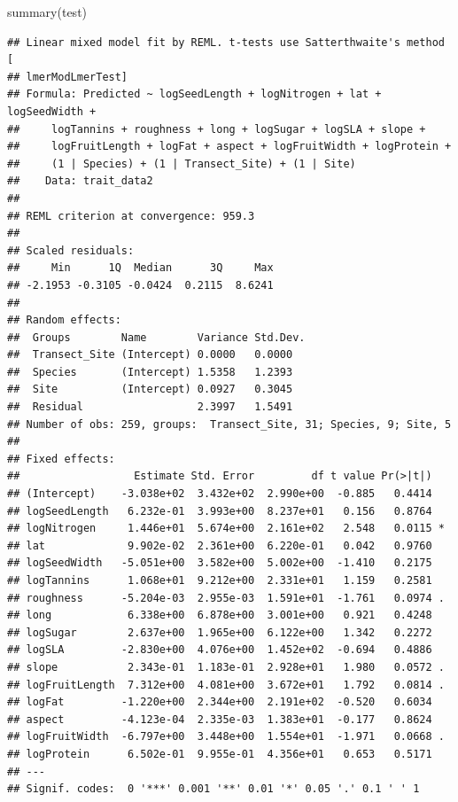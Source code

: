 \documentclass[
  12pt,
]{article}
\newenvironment{Shaded}{\begin{snugshade}}{\end{snugshade}}
\newcommand{\FunctionTok}[1]{\textcolor[rgb]{0.00,0.00,0.00}{#1}}
\newcommand{\NormalTok}[1]{#1}
\begin{document}
\begin{Shaded}
\begin{Highlighting}[]
\FunctionTok{summary}\NormalTok{(test)}
\end{Highlighting}
\end{Shaded}

\begin{verbatim}
## Linear mixed model fit by REML. t-tests use Satterthwaite's method [
## lmerModLmerTest]
## Formula: Predicted ~ logSeedLength + logNitrogen + lat + logSeedWidth +  
##     logTannins + roughness + long + logSugar + logSLA + slope +  
##     logFruitLength + logFat + aspect + logFruitWidth + logProtein +  
##     (1 | Species) + (1 | Transect_Site) + (1 | Site)
##    Data: trait_data2
## 
## REML criterion at convergence: 959.3
## 
## Scaled residuals: 
##     Min      1Q  Median      3Q     Max 
## -2.1953 -0.3105 -0.0424  0.2115  8.6241 
## 
## Random effects:
##  Groups        Name        Variance Std.Dev.
##  Transect_Site (Intercept) 0.0000   0.0000  
##  Species       (Intercept) 1.5358   1.2393  
##  Site          (Intercept) 0.0927   0.3045  
##  Residual                  2.3997   1.5491  
## Number of obs: 259, groups:  Transect_Site, 31; Species, 9; Site, 5
## 
## Fixed effects:
##                  Estimate Std. Error         df t value Pr(>|t|)  
## (Intercept)    -3.038e+02  3.432e+02  2.990e+00  -0.885   0.4414  
## logSeedLength   6.232e-01  3.993e+00  8.237e+01   0.156   0.8764  
## logNitrogen     1.446e+01  5.674e+00  2.161e+02   2.548   0.0115 *
## lat             9.902e-02  2.361e+00  6.220e-01   0.042   0.9760  
## logSeedWidth   -5.051e+00  3.582e+00  5.002e+00  -1.410   0.2175  
## logTannins      1.068e+01  9.212e+00  2.331e+01   1.159   0.2581  
## roughness      -5.204e-03  2.955e-03  1.591e+01  -1.761   0.0974 .
## long            6.338e+00  6.878e+00  3.001e+00   0.921   0.4248  
## logSugar        2.637e+00  1.965e+00  6.122e+00   1.342   0.2272  
## logSLA         -2.830e+00  4.076e+00  1.452e+02  -0.694   0.4886  
## slope           2.343e-01  1.183e-01  2.928e+01   1.980   0.0572 .
## logFruitLength  7.312e+00  4.081e+00  3.672e+01   1.792   0.0814 .
## logFat         -1.220e+00  2.344e+00  2.191e+02  -0.520   0.6034  
## aspect         -4.123e-04  2.335e-03  1.383e+01  -0.177   0.8624  
## logFruitWidth  -6.797e+00  3.448e+00  1.554e+01  -1.971   0.0668 .
## logProtein      6.502e-01  9.955e-01  4.356e+01   0.653   0.5171  
## ---
## Signif. codes:  0 '***' 0.001 '**' 0.01 '*' 0.05 '.' 0.1 ' ' 1
\end{verbatim}
\end{document}
